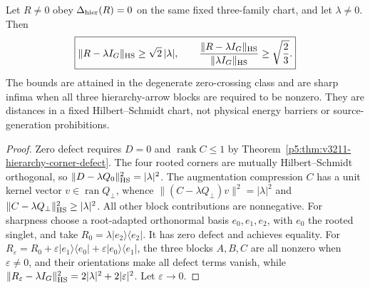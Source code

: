 \documentclass[12pt,a4paper]{article}
\begin{document}
\begin{corollary}
\label{p5:cor:v3024-rooted-identity-separation}
Let \(R\ne0\) obey \(\Delta_{\rm hier}(R)=0\) on the same
fixed three-family chart, and let \(\lambda\ne0\).  Then
\[
 \boxed{\|R-\lambda I_G\|_{\rm HS}\ge\sqrt2\,|\lambda|,
 \qquad
 \frac{\|R-\lambda I_G\|_{\rm HS}}
 {\|\lambda I_G\|_{\rm HS}}\ge\sqrt{\frac23}.}
\]
The bounds are attained in the degenerate zero-crossing class and are
sharp infima when all three hierarchy-arrow blocks are required to be
nonzero.  They are distances in a fixed Hilbert--Schmidt chart, not
physical energy barriers or source-generation prohibitions.
\end{corollary}
\begin{proof}
Zero defect requires \(D=0\) and \(\operatorname{rank}C\le1\)
by Theorem~\ref{p5:thm:v3211-hierarchy-corner-defect}.
The four rooted corners are mutually Hilbert--Schmidt orthogonal,
so \(\|D-\lambda Q_0\|_{\rm HS}^2=|\lambda|^2\).
The augmentation compression \(C\) has a unit kernel vector
\(v\in\operatorname{ran}Q_\perp\), whence
\(\|(C-\lambda Q_\perp)v\|^2=|\lambda|^2\) and
\(\|C-\lambda Q_\perp\|_{\rm HS}^2\ge|\lambda|^2\).
All other block contributions are nonnegative.
For sharpness choose a root-adapted orthonormal basis
\(e_0,e_1,e_2\), with \(e_0\) the rooted singlet, and take
\(R_0=\lambda|e_2\rangle\langle e_2|\).
It has zero defect and achieves equality.  For
\(R_\varepsilon=R_0+\varepsilon|e_1\rangle\langle e_0|
 +\varepsilon|e_0\rangle\langle e_1|\), the three blocks
\(A,B,C\) are all nonzero when \(\varepsilon\ne0\), and their
orientations make all defect terms vanish, while
\(\|R_\varepsilon-\lambda I_G\|_{\rm HS}^2
 =2|\lambda|^2+2|\varepsilon|^2\).  Let
\(\varepsilon\to0\).
\end{proof}
\end{document}
